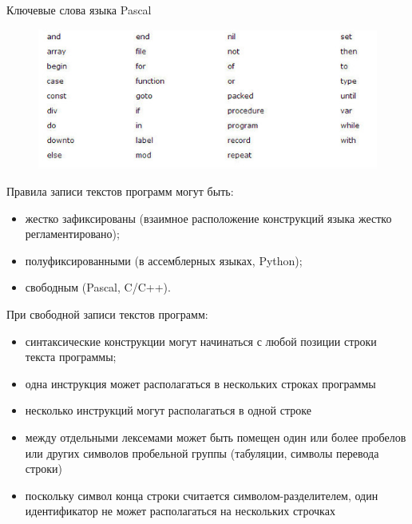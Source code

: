 \documentclass{beamer}
\begin{document}
\begin{frame}
Ключевые слова языка Pascal
\begin{figure}[h]
\centering
\includegraphics[scale=0.6]{images/lec01-pic17.png}
\end{figure}
\end{frame}

\begin{frame}
Правила записи текстов программ могут быть:
\begin{itemize}
\item жестко зафиксированы (взаимное расположение конструкций языка жестко регламентировано);
\item полуфиксированными (в ассемблерных языках, Python);
\item свободным (Pascal, C/C++).
\end{itemize}
При свободной записи текстов программ:
\begin{itemize}
\item синтаксические конструкции могут начинаться с любой позиции строки текста программы;
\item одна инструкция может располагаться в нескольких строках программы
\item несколько инструкций могут располагаться в одной строке
\item между отдельными лексемами может быть помещен один
или более пробелов или других символов пробельной группы (табуляции,
символы перевода строки)
\item поскольку символ конца строки считается символом-разделителем,
один идентификатор не может располагаться на нескольких строчках
\end{itemize}
\end{frame}
\end{document}
